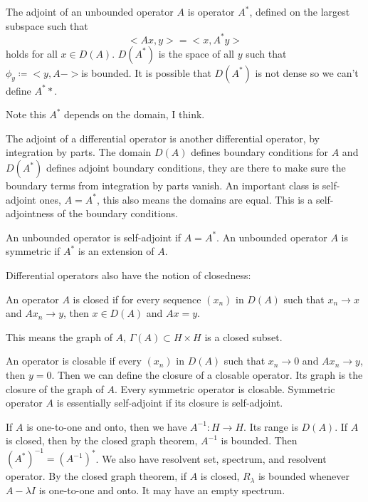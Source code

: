\documentclass[main.tex]{subfiles}
\begin{document}
The adjoint of an unbounded operator $A$ is operator $A^*$, defined on the largest subspace such that 
$$
<Ax,y> = <x, A^* y>
$$
holds for all $x \in D(A)$. $D(A^*)$ is the space of all $y$ such that $\phi_y \coloneqq <y, A -> $is bounded. It is possible that $D(A^*)$ is not dense so we can't define $A^**$.

\begin{remark}
Note this $A^*$ depends on the domain, I think.
\end{remark}

The adjoint of a differential operator is another differential operator, by integration by parts. The domain $D(A)$ defines boundary conditions for $A$ and $D(A^*)$ defines adjoint boundary conditions, they are there to make sure the boundary terms from integration by parts vanish. An important class is self-adjoint ones, $A = A^*$, this also means the domains are equal. This is a self-adjointness of the boundary conditions.

\begin{defintion}
An unbounded operator is self-adjoint if $A  = A^*$. An unbounded operator $A$ is symmetric if $A^*$ is an extension of $A$.
\end{defintion}

Differential operators also have the notion of closedness:

\begin{definition}
An operator $A$ is closed if for every sequence $(x_n)$ in $D(A)$ such that $x_n \rightarrow x$ and $A x_n \rightarrow y$, then $x \in D(A)$ and $Ax = y$.
\end{definition}

This means the graph of $A$, $\Gamma(A) \subset H \times H$ is a closed subset.

An operator is closable if every $(x_n)$ in $D(A)$ such that $x_n \rightarrow 0$ and $A x_n \rightarrow y$, then $y = 0$. Then we can define the closure of a closable operator. Its graph is the closure of the graph of $A$. Every symmetric operator is closable. Symmetric operator $A$ is essentially self-adjoint if its closure is self-adjoint.

If $A$ is one-to-one and onto, then we have $A^{-1}: H \rightarrow H$. Its range is $D(A)$. If $A$ is closed, then by the closed graph theorem, $A^{-1}$ is bounded. Then $(A^*)^{-1} = (A^{-1})^*$. We also have resolvent set, spectrum, and resolvent operator. By the closed graph theorem, if $A$ is closed, $R_\lambda$ is bounded whenever $A - \lambda I$ is one-to-one and onto. It may have an empty spectrum.
\end{document}
